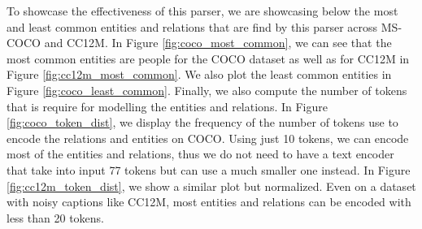 To showcase the effectiveness of this parser, we are showcasing below the most and least common entities and relations that are find by this parser across MS-COCO and CC12M. In Figure \ref{fig:coco_most_common}, we can see that the most common entities are people for the COCO dataset as well as for CC12M in Figure \ref{fig:cc12m_most_common}. We also plot the least common entities in Figure \ref{fig:coco_least_common}. Finally, we also compute the number of tokens that is require for modelling the entities and relations. In Figure \ref{fig:coco_token_dist}, we display the frequency of the number of tokens use to encode the relations and entities on COCO. Using just 10 tokens, we can encode most of the entities and relations, thus we do not need to have a text encoder that take into input 77 tokens but can use a much smaller one instead. In Figure \ref{fig:cc12m_token_dist}, we show a similar plot but normalized. Even on a dataset with noisy captions like CC12M, most entities and relations can be encoded with less than 20 tokens.

